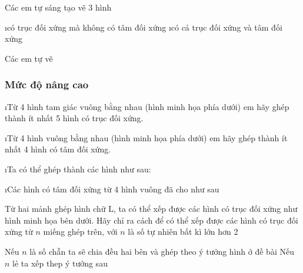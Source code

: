 \begin{bt}
	Các em tự sáng tạo vẽ 3 hình
	\begin{enumerate}[a), leftmargin=*]
		\i có trục đối xứng mà không có tâm đối xứng 
		\i có cả trục đối xứng và tâm đối xứng
	\end{enumerate}
	\begin{loigiaichuong36}
		Các em tự vẽ
	\end{loigiaichuong36}
\end{bt}
\subsubsection*{Mức độ nâng cao}
\begin{bt}
	\begin{enumerate}[a), leftmargin=*]
		\i Từ 4 hình tam giác vuông bằng nhau (hình minh họa phía dưới) em hãy ghép thành ít nhất 5 hình có trục đối xứng.
		
		\i Từ 4 hình vuông bằng nhau (hình minh họa phía dưới) em hãy ghép thành ít nhất 4 hình có tâm đối xứng.
	\end{enumerate}
	\begin{loigiaichuong36}
		\begin{enumerate}[a), leftmargin=*]
			\i Ta có thể ghép thành các hình như sau: 

			\i Các hình có tâm đối xứng từ 4 hình vuông đã cho như sau
			
		\end{enumerate}		
	\end{loigiaichuong36}
\end{bt}
\begin{bt}
	Từ hai mảnh ghép hình chữ L, ta có thể xếp được các hình có trục đối xứng như hình minh họa bên dưới. Hãy chỉ ra cách để có thể xếp được các hình có trục đối xứng từ $n$ miếng ghép trên, với $n$ là số tự nhiên bất kì lớn hơn 2
	\begin{loigiaichuong36}
		Nếu $n$ là số chẵn ta sẽ chia đều hai bên và ghép theo ý tưởng hình ở đề bài
		Nếu $n$ lẻ ta xếp thep ý tưởng sau
	\end{loigiaichuong36}
\end{bt}
